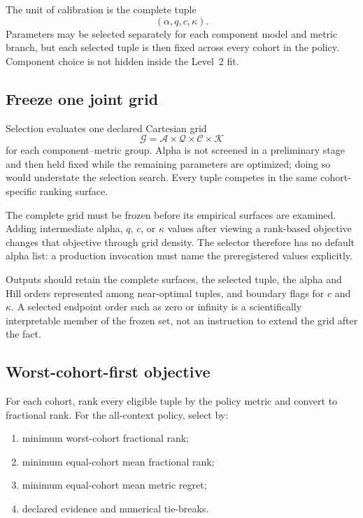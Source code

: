 \documentclass[11pt]{article}
\begin{document}
The unit of calibration is the complete tuple
\[
(\alpha,q,c,\kappa).
\]
Parameters may be selected separately for each component model and metric
branch, but each selected tuple is then fixed across every cohort in the
policy. Component choice is not hidden inside the Level~2 fit.

\subsection{Freeze one joint grid}

Selection evaluates one declared Cartesian grid
\begin{equation}
\mathcal G
=
\mathcal A\times\mathcal Q\times\mathcal C\times\mathcal K
\end{equation}
for each component--metric group. Alpha is not screened in a preliminary
stage and then held fixed while the remaining parameters are optimized; doing
so would understate the selection search. Every tuple competes in the same
cohort-specific ranking surface.

The complete grid must be frozen before its empirical surfaces are examined.
Adding intermediate alpha, $q$, $c$, or $\kappa$ values after viewing a
rank-based objective changes that objective through grid density. The selector
therefore has no default alpha list: a production invocation must name the
preregistered values explicitly.

Outputs should retain the complete surfaces, the selected tuple, the alpha
and Hill orders represented among near-optimal tuples, and boundary flags for
$c$ and $\kappa$. A selected endpoint order such as zero or infinity is a
scientifically interpretable member of the frozen set, not an instruction to
extend the grid after the fact.

\subsection{Worst-cohort-first objective}

For each cohort, rank every eligible tuple by the policy metric and convert to
fractional rank. For the all-context policy, select by:

\begin{enumerate}
  \item minimum worst-cohort fractional rank;
  \item minimum equal-cohort mean fractional rank;
  \item minimum equal-cohort mean metric regret;
  \item declared evidence and numerical tie-breaks.
\end{enumerate}
\end{document}
